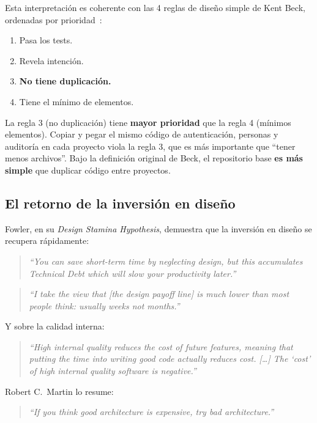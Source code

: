 \documentclass[conference]{IEEEtran}
\begin{document}
Esta interpretaci\'on es coherente con las 4 reglas de dise\~no
simple de Kent Beck, ordenadas por
prioridad~\cite{fowler_beck}:

\begin{enumerate}
  \item Pasa los tests.
  \item Revela intenci\'on.
  \item \textbf{No tiene duplicaci\'on.}
  \item Tiene el m\'inimo de elementos.
\end{enumerate}

La regla 3 (no duplicaci\'on) tiene \textbf{mayor prioridad} que
la regla 4 (m\'inimos elementos). Copiar y pegar el mismo c\'odigo
de autenticaci\'on, personas y auditor\'ia en cada proyecto viola
la regla 3, que es m\'as importante que ``tener menos archivos''.
Bajo la definici\'on original de Beck, el repositorio base
\textbf{es m\'as simple} que duplicar c\'odigo entre proyectos.

\subsection{El retorno de la inversi\'on en dise\~no}

Fowler, en su \textit{Design Stamina Hypothesis}, demuestra que
la inversi\'on en dise\~no se recupera r\'apidamente:

\begin{quote}
\textit{``You can save short-term time by neglecting design, but
this accumulates Technical Debt which will slow your productivity
later.''}~\cite{fowler_stamina}
\end{quote}

\begin{quote}
\textit{``I take the view that [the design payoff line] is much
lower than most people think: usually weeks not
months.''}~\cite{fowler_stamina}
\end{quote}

Y sobre la calidad interna:

\begin{quote}
\textit{``High internal quality reduces the cost of future
features, meaning that putting the time into writing good code
actually reduces cost. [\ldots] The `cost' of high internal quality
software is negative.''}~\cite{fowler_quality}
\end{quote}

Robert C.\ Martin lo resume:

\begin{quote}
\textit{``If you think good architecture is expensive, try bad
architecture.''}~\cite{martin2017}
\end{quote}
\end{document}
